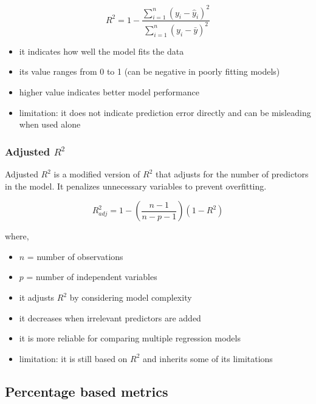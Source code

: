 \documentclass{article}
\begin{document}
    \begin{equation}
        R^2 = 1 - \frac{\sum_{i=1}^{n} (y_i - \hat{y}_i)^2}{\sum_{i=1}^{n} (y_i - \bar{y})^2}
    \end{equation}

    \begin{itemize}
        \item it indicates how well the model fits the data
        \item its value ranges from 0 to 1 (can be negative in poorly fitting models)
        \item higher value indicates better model performance
        \item limitation: it does not indicate prediction error directly and can be misleading when used alone
    \end{itemize}

\subsubsection{Adjusted $R^2$}

 Adjusted $R^2$ is a modified version of $R^2$ that adjusts for the number of predictors in the model. It penalizes unnecessary variables to prevent overfitting.

   \begin{equation}
       R^2_{adj} = 1 - \left( \frac{n - 1}{n - p - 1} \right)(1 - R^2)
    \end{equation}

    where,
    \begin{itemize}
        \item $n$ = number of observations
        \item $p$ = number of independent variables
    \end{itemize}

    \begin{itemize}
        \item it adjusts $R^2$ by considering model complexity
        \item it decreases when irrelevant predictors are added
        \item it is more reliable for comparing multiple regression models
        \item limitation: it is still based on $R^2$ and inherits some of its limitations
    \end{itemize}

    \subsection{Percentage based metrics}
\end{document}
